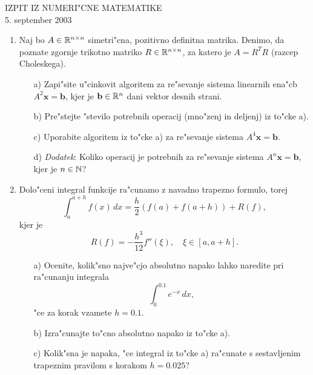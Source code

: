 

\begin{center}
  IZPIT IZ NUMERI"CNE MATEMATIKE\\
  5. september 2003
\end{center}
\vspace{2cm}

\begin{enumerate}
  \item Naj bo $A\in\mathbb{R}^{n\times n}$ simetri"cna,
  pozitivno definitna matrika. Denimo, da poznate 
  zgornje trikotno matriko
  $R\in\mathbb{R}^{n\times n}$, za katero je $A=R^TR$ (razcep 
  Choleskega).
  \begin{itemize}
    \item[a)] Zapi"site u"cinkovit algoritem za re"sevanje
    sistema linearnih ena"cb $A^2\mathbf{x}=\mathbf{b}$, kjer
    je $\mathbf{b}\in\mathbb{R}^{n}$ dani vektor desnih strani.

    \item[b)] Pre"stejte "stevilo potrebnih operacij
    (mno"zenj in deljenj) iz to"cke a).
 
   \item[c)] Uporabite algoritem iz to"cke a) za
    re"sevanje sistema $A^4\mathbf{x}=\mathbf{b}$.
   
   \item[d)] {\sl Dodatek}: Koliko operacij je potrebnih za
   re"sevanje sistema $A^n\mathbf{x}=\mathbf{b}$, kjer je
   $n\in\mathbb{N}$?
  \end{itemize}
  
  \item Dolo"ceni integral funkcije ra"cunamo 
  z navadno trapezno formulo, torej
  $$\int_{a}^{a+h}f(x)\,dx=\frac{h}{2}
  \left(f(a)+f(a+h)\right)+R(f),$$
  kjer je 
  $$R(f)=-\frac{h^3}{12}f''(\xi),\quad \xi\in[a,a+h].$$
  \begin{itemize}
    \item[a)] Ocenite, kolik"sno najve"cjo absolutno
    napako lahko naredite
    pri ra"cunanju integrala
    $$\int_{0}^{0.1}e^{-x}\,dx,$$
    "ce za korak vzamete $h=0.1$.
    \item[b)] Izra"cunajte to"cno absolutno napako
    iz to"cke a).
    \item[c)] Kolik"sna je napaka, "ce integral iz to"cke
    a) ra"cunate s sestavljenim trapeznim pravilom s korakom
    $h=0.025$?
  \end{itemize}
\end{enumerate}


